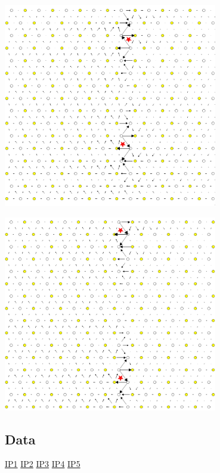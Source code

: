 \documentclass[11pt]{article}
\begin{document}
\begin{center}
\includegraphics[width=0.7\textwidth]{Images/final_model_peierls_xy_0.03_initial_partials.png}
\end{center}
\begin{center}
\includegraphics[width=0.7\textwidth]{Images/final_model_peierls_xy_0.03_final_partials.png}
\end{center}


\subsection{Data}
\label{sec:orgfd7559c}
\href{file:///home/tigany/Documents/ti/final\_model\_2019-11-12/results\_2019-11-09\_muc/IP1-oo\_19-11-09--04-46-00.log}{IP1}
\href{file:///home/tigany/Documents/ti/final\_model\_2019-11-12/results\_2019-11-09\_muc/IP2-oo\_19-11-09--04-46-00.log}{IP2}
\href{file:///home/tigany/Documents/ti/final\_model\_2019-11-12/results\_2019-11-09\_muc/IP3-oo\_19-11-09--04-46-00.log}{IP3}
\href{file:///home/tigany/Documents/ti/final\_model\_2019-11-12/results\_2019-11-09\_muc/IP4-oo\_19-11-09--04-46-00.log}{IP4}
\href{file:///home/tigany/Documents/ti/final\_model\_2019-11-12/results\_2019-11-09\_muc/IP5-oo\_19-11-09--04-46-00.log}{IP5}
\end{document}
